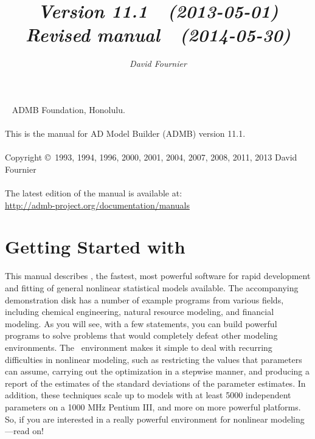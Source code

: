 \documentclass{admbmanual}
\newcommand\admbversion{11.1}
\begin{document}
\title{%
  \vspace{3ex}\textsf{\textit{Version \admbversion~~(2013-05-01)\\[3pt]
      Revised manual~~(2014-05-30)}}\vspace{3ex}
}
\author{\textsf{\textit{David Fournier}}}
\maketitle

~\vfill
\noindent ADMB Foundation, Honolulu.\\\\
\noindent This is the manual for AD Model Builder (ADMB) version
\admbversion.\\\\
\noindent Copyright \copyright\ 1993, 1994, 1996, 2000, 2001, 2004, 2007, 2008,
2011, 2013 David Fournier\\\\
\noindent The latest edition of the manual is available at:\\
\url{http://admb-project.org/documentation/manuals}

\tableofcontents

\chapter{Getting Started with \ADM}

This manual describes \ADM, the fastest, most powerful software for rapid
development and fitting of general nonlinear statistical models available. The
accompanying demonstration disk has a number of example programs from various
fields, including chemical engineering, natural resource modeling, and financial
modeling. As you will see, with a few statements, you can build powerful
programs to solve problems that would completely defeat other modeling
environments. The \ADM\ environment makes it simple to deal with recurring
difficulties in nonlinear modeling, such as restricting the values that
parameters can assume, carrying out the optimization in a stepwise manner, and
producing a report of the estimates of the standard deviations of the parameter
estimates. In addition, these techniques scale up to models with at least 5000
independent parameters on a 1000 MHz Pentium III, and more on more powerful
platforms. So, if you are interested in a really powerful environment for
nonlinear modeling---read on!
\end{document}
